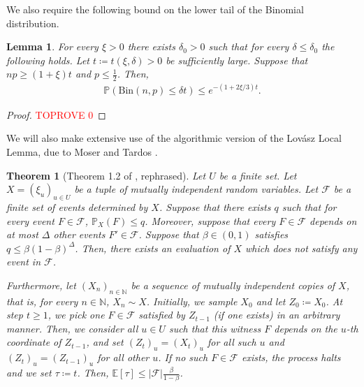 \documentclass[notitlepage]{scrartcl}
\newtheorem{theorem}{Theorem}
\newtheorem{lemma}[thm]{Lemma}
\begin{document}
We also require the following bound on the lower tail of the Binomial distribution.
\begin{lemma}\label{l: binom lower tail}
For every $\xi>0$ there exists $\delta_0>0$ such that for every $\delta\le \delta_0$ the following holds. Let $t\coloneqq t(\xi,\delta)>0$ be sufficiently large. Suppose that $np\ge (1+\xi)t$ and $p\le \frac{1}{2}$. Then,
\begin{align*}
    \mathbb{P}\left(\text{Bin}\left(n,p\right)\le \delta t\right)\le e^{-(1+2\xi/3)t}.
\end{align*}
\end{lemma}
\begin{proof}\textcolor{red}{TOPROVE 0}\end{proof}



We will also make extensive use of the algorithmic version of the Lov\'asz Local Lemma, due to Moser and Tardos \cite{MT10}. 
\begin{theorem}[Theorem 1.2 of \cite{MT10}, rephrased]\label{th: LLL}
Let $U$ be a finite set. Let $X=(\xi_u)_{u\in U}$ be a tuple of mutually independent random variables. Let $\mathcal{F}$ be a finite set of events determined by $X$. Suppose that there exists $q$ such that for every event $F\in \mathcal{F}$, $\mathbb{P}_X(F)\le q$. Moreover, suppose that every $F\in \mathcal{F}$ depends on at most $\Delta$ other events $F'\in \mathcal{F}$. Suppose that $\beta\in (0,1)$ satisfies $q\le \beta(1-\beta)^{\Delta}$. Then, there exists an evaluation of $X$ which does not satisfy any event in $\mathcal{F}$. 

Furthermore, let $(X_n)_{n\in \mathbb{N}}$ be a sequence of mutually independent copies of $X$, that is, for every $n\in \mathbb{N}$, $X_n\sim X$. Initially, we sample $X_0$ and let $Z_0\coloneqq X_0$. At step $t\ge 1$, we pick one $F\in \mathcal{F}$ satisfied by $Z_{t-1}$  (if one exists) in an arbitrary manner. Then, we consider all $u\in U$ such that this witness $F$ depends on the $u$-th coordinate of $Z_{t-1}$, and set $(Z_t)_u=(X_t)_u$ for all such $u$ and $(Z_t)_u=(Z_{t-1})_u$ for all other $u$. If no such $F \in \mathcal{F}$ exists, the process halts and we set $\tau\coloneqq t$. Then, $\mathbb{E}\left[\tau\right]\le |\mathcal{F}|\frac{\beta}{1-\beta}$.
\end{theorem}
\end{document}

